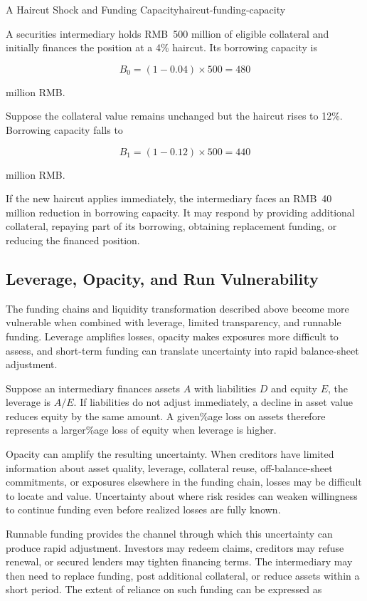 \begin{example}{A Haircut Shock and Funding Capacity}{haircut-funding-capacity}

A securities intermediary holds RMB~500 million of eligible collateral and initially finances the position at a 4\% haircut. Its borrowing capacity is

\[
B_0=(1-0.04)\times 500=480
\]

million RMB.

Suppose the collateral value remains unchanged but the haircut rises to 12\%. Borrowing capacity falls to

\[
B_1=(1-0.12)\times 500=440
\]

million RMB.

If the new haircut applies immediately, the intermediary
faces an RMB~40 million reduction in borrowing capacity.
It may respond by providing additional collateral,
repaying part of its borrowing, obtaining replacement
funding, or reducing the financed position.

\end{example}

\subsection{Leverage, Opacity, and Run Vulnerability}

The funding chains and liquidity transformation described above become more vulnerable when combined with leverage, limited transparency, and runnable funding. Leverage amplifies losses, opacity makes exposures more difficult to assess, and short-term funding can translate uncertainty into rapid balance-sheet adjustment.

Suppose an intermediary finances assets $A$ with liabilities $D$ and equity $E$, the leverage is $A/E$. If liabilities do not adjust immediately, a decline in asset value reduces equity by the same amount. A given\%age loss on assets therefore represents a larger\%age loss of equity when leverage is higher.

Opacity can amplify the resulting uncertainty. When creditors have limited information about asset quality, leverage, collateral reuse, off-balance-sheet commitments, or exposures elsewhere in the funding chain, losses may be difficult to locate and value. Uncertainty about where risk resides can weaken willingness to continue funding even before realized losses are fully known.

Runnable funding provides the channel through which this uncertainty can produce rapid adjustment. Investors may redeem claims, creditors may refuse renewal, or secured lenders may tighten financing terms. The intermediary may then need to replace funding, post additional collateral, or reduce assets within a short period. The extent of reliance on such funding can be expressed as

